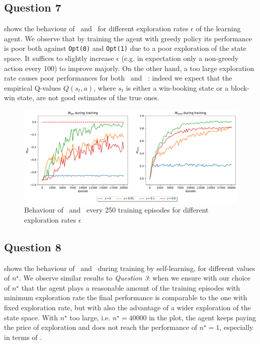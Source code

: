 \documentclass[10pt]{IEEEtran}
\begin{document}
\subsection*{Question 7}
 shows the behaviour of \mopt\ and \mrand\ for different exploration rates $\epsilon$ of the learning agent. We observe that by training the agent with greedy policy its performance is poor both against \texttt{Opt(0)} and \texttt{Opt(1)} due to a poor exploration of the state space. It suffices to slightly increase $\epsilon$ (e.g. in expectation only a non-greedy action every 100) to improve majorly. On the other hand, a too large exploration rate causes poor performances for both \mopt\ and \mrand\ : indeed we expect that the empirical Q-values $Q(s_t, a)$, where $s_t$ is either a win-booking state or a block-win state, are not good estimates of the true ones.
\begin{figure}[h]
    \centering
    \includegraphics[width=\linewidth]{code/figures/performance_epsilon_self.pdf}
    \caption{Behaviour of \mopt\ and \mrand\ every 250 training episodes for different exploration rates $\epsilon$}
    \label{plot_question7}
\end{figure}


\subsection*{Question 8}
 shows the behaviour of \mopt\ and \mrand\ during training by self-learning, for different values of $n^{\star}$. We observe similar results to \emph{Question 3}: when we ensure with our choice of $n^{\star}$ that the agent plays a reasonable amount of the training episodes with minimum exploration rate the final performance is comparable to the one with fixed exploration rate, but with also the advantage of a wider exploration of the state space. With $n^{\star}$ too large, i.e. $n^{\star} = 40000$ in the plot, the agent keeps paying the price of exploration and does not reach the performance of $n^{\star} = 1$, especially in terms of \mopt.
\end{document}
